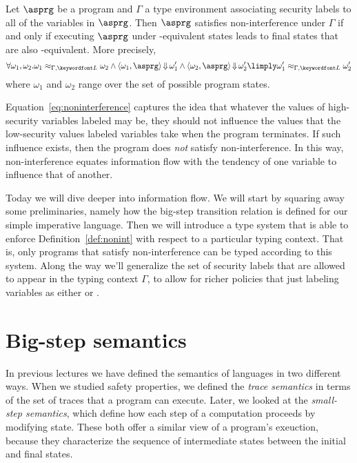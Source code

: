 \documentclass[11pt,twoside]{scrartcl}
\begin{document}
\begin{definition}
\label{def:nonint}
Let $\asprg$ be a program and $\Gamma$ a type environment associating security labels to all of the variables in $\asprg$. Then $\asprg$ satisfies non-interference under $\Gamma$ if and only if executing $\asprg$ under \lowsec-equivalent states leads to final states that are also \lowsec-equivalent. More precisely,
\begin{equation}
\label{eq:noninterference}
\forall \omega_1,\omega_2 . \omega_1 \approx_{\Gamma,\lowsec} \omega_2 \land 
\langle \omega_1, \asprg\rangle \bigstep \omega_1' \land 
\langle \omega_2, \asprg\rangle \bigstep \omega_2'
\limply
\omega_1' \approx_{\Gamma,\lowsec} \omega_2'
\end{equation}
where $\omega_1$ and $\omega_2$ range over the set of possible program states.
\end{definition}

Equation~\ref{eq:noninterference} captures the idea that whatever the values of high-security variables labeled \hisec may be, they should not influence the values that the low-security values labeled \lowsec variables take when the program terminates. If such influence exists, then the program does \emph{not} satisfy non-interference. In this way, non-interference equates information flow with the tendency of one variable to influence that of another.

Today we will dive deeper into information flow. We will start by squaring away some preliminaries, namely how the big-step transition relation is defined for our simple imperative language. Then we will introduce a type system that is able to enforce Definition~\ref{def:nonint} with respect to a particular typing context. That is, only programs that satisfy non-interference can be typed according to this system. Along the way we'll generalize the set of security labels that are allowed to appear in the typing context $\Gamma$, to allow for richer policies that just labeling variables as either \hisec or \lowsec.

\section{Big-step semantics}

In previous lectures we have defined the semantics of languages in two different ways. When we studied safety properties, we defined the \emph{trace semantics} in terms of the set of traces that a program can execute. Later, we looked at the \emph{small-step semantics}, which define how each step of a computation proceeds by modifying state. These both offer a similar view of a program's exeuction, because they characterize the sequence of intermediate states between the initial and final states.
\end{document}
